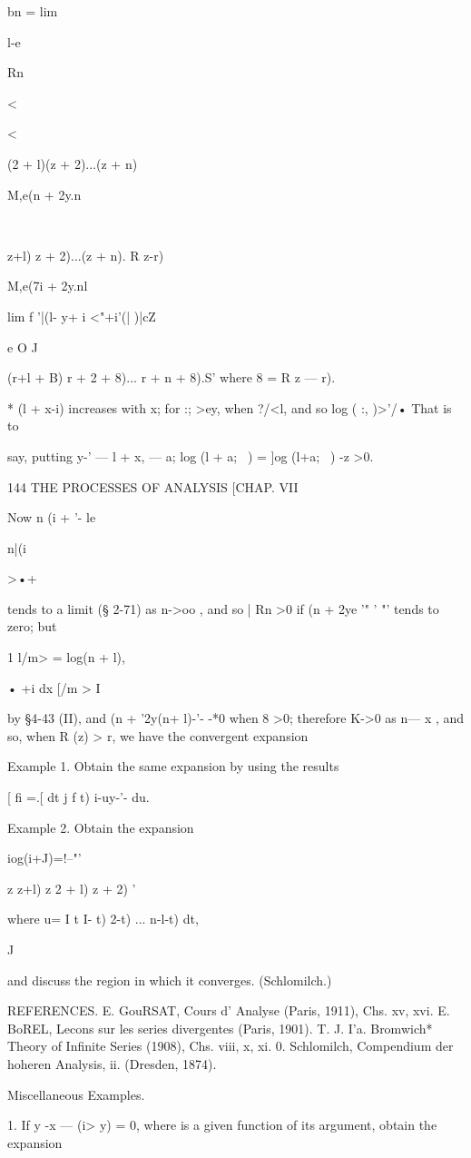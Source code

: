 {bn = lim

l-e

Rn\ \

<

<

(2 + l)(z + 2)...(z + n)

M,e(n + 2y.n\

\ \ {z+l) z + 2)...(z + n). R z-r)

M,e(7i + 2y.nl

lim f '|(l- y+ i <"+i'(| )|cZ

e O J

(r+l + B) r + 2 + 8)... r + n + 8).S' where 8 = R z — r).

* (l + x-i) increases with x; for :; >ey, when ?/<l, and so log ( :,
)>'/• That is to

say, putting y-' — l + x, — a; log (l + a;~ ) = ]og (l+a;~ ) -z >0.

144 THE PROCESSES OF ANALYSIS [CHAP. VII

Now n (i + '- le

n|(i

>•+

tends to a limit (§ 2-71) as n->oo , and so | Rn >0 if (n + 2ye '" '
"' tends to zero; but

1 l/m> = log(n + l),

• +i dx [/m > I

by §4-43 (II), and (n + '2y(n+ l)-'- -*0 when 8 >0; therefore K->0 as
n— x , and so, when R (z) > r, we have the convergent expansion

Example 1. Obtain the same expansion by using the results

[ fi =.[ dt j f t) i-uy-'- du.

Example 2. Obtain the expansion

iog(i+J)=!--"'

z z+l) z 2 + l) z + 2) '

where u= I t I- t) 2-t) ... n-l-t) dt,

J

and discuss the region in which it converges. (Schlomilch.)

REFERENCES. E. GouRSAT, Cours d' Analyse (Paris, 1911), Chs. xv, xvi.
E. BoREL, Lecons sur les series divergentes (Paris, 1901). T. J. I'a.
Bromwich* Theory of Infinite Series (1908), Chs. viii, x, xi. 0.
Schlomilch, Compendium der hoheren Analysis, ii. (Dresden, 1874).

Miscellaneous Examples.

1. If y -x — (i> y) = 0, where is a given function of its argument,
obtain the expansion

}}
